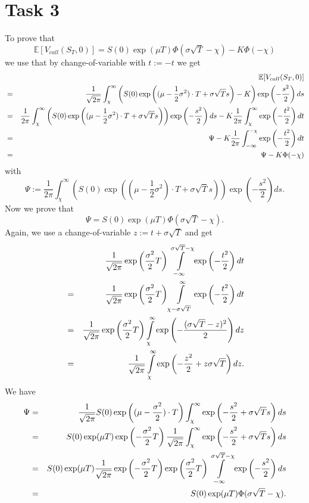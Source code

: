 \documentclass[10pt,a4paper]{article}
\begin{document}
\section*{Task 3}
To prove that
\[
\mathbb{E}[V_{call}(S_T,0)]=S(0)\exp(\mu T)\Phi(\sigma\sqrt{T}-\chi)-K\Phi(-\chi)
\]
we use that by change-of-variable with $t:=-t$ we get
\begin{eqnarray}
&&\mathbb{E}[V_{call}(S_T,0)] \notag\\
&=&\frac{1}{\sqrt{2\pi}}\int_{\chi}^{\infty}\left(S(0)\exp\left((\mu-\frac{1}{2}\sigma^2)\cdot T+\sigma\sqrt{T}s\right)-K\right)\exp\left(-\frac{s^2}{2}\right)ds \notag\\
&=&\frac{1}{2\pi}\int_{\chi}^{\infty}\left(S(0)\exp\left((\mu-\frac{1}{2}\sigma^2)\cdot T+\sigma\sqrt{T}s\right)\right)\exp\left(-\frac{s^2}{2}\right)ds-K\frac{1}{2\pi}\int_{\chi}^{\infty}\exp\left(-\frac{t^2}{2}\right)dt \notag\\
&=&\Psi-K\frac{1}{2\pi}\int_{-\infty}^{-\chi}\exp\left(-\frac{t^2}{2}\right)dt \notag\\
&=&\Psi-K\Phi(-\chi) \notag
\end{eqnarray}
with
\[
\Psi:=\frac{1}{2\pi}\int_{\chi}^{\infty}\left(S(0)\exp\left((\mu-\frac{1}{2}\sigma^2)\cdot T+\sigma\sqrt{T}s\right)\right)\exp\left(-\frac{s^2}{2}\right)ds.
\]
Now we prove that
\[
\Psi=S(0)\exp(\mu T)\Phi(\sigma\sqrt{T}-\chi).
\]
Again, we use a change-of-variable $z:=t+\sigma\sqrt{T}$ and get
\begin{eqnarray}
&&\frac{1}{\sqrt{2\pi}}\exp\left(\frac{\sigma^2}{2}T\right)\int\limits_{-\infty}^{\sigma\sqrt{T}-\chi}\exp\left(-\frac{t^2}{2}\right)dt \notag\\
&=&\frac{1}{\sqrt{2\pi}}\exp\left(\frac{\sigma^2}{2}T\right)\int\limits_{\chi-\sigma\sqrt{T}}^{\infty}\exp\left(-\frac{t^2}{2}\right)dt \notag\\
&=&\frac{1}{\sqrt{2\pi}}\exp\left(\frac{\sigma^2}{2}T\right)\int\limits_{\chi}^{\infty}\exp\left(-\frac{(\sigma\sqrt{T}-z)^2}{2}\right)dz \notag\\
&=&\frac{1}{\sqrt{2\pi}}\int\limits_{\chi}^{\infty}\exp\left(-\frac{z^2}{2}+z\sigma\sqrt{T}\right)dz. \notag
\end{eqnarray}
We have
\begin{eqnarray}
\Psi&=&\frac{1}{\sqrt{2\pi}}S(0)\exp\left((\mu-\frac{\sigma^2}{2})\cdot T\right)\int_{\chi}^{\infty}\exp\left(-\frac{s^2}{2}+\sigma\sqrt{T}s\right)ds \notag\\
&=&S(0)\exp(\mu T)\exp\left(-\frac{\sigma^2}{2}T\right)\frac{1}{\sqrt{2\pi}}\int_{\chi}^{\infty}\exp\left(-\frac{s^2}{2}+\sigma\sqrt{T}s\right)ds \notag\\
&=&S(0)\exp(\mu T)\frac{1}{\sqrt{2\pi}}\exp\left(-\frac{\sigma^2}{2}T\right)\exp\left(\frac{\sigma^2}{2}T\right)\int\limits_{-\infty}^{\sigma\sqrt{T}-\chi}\exp\left(-\frac{s^2}{2}\right)ds \notag\\
&=&S(0)\exp(\mu T)\Phi(\sigma\sqrt{T}-\chi). \notag
\end{eqnarray}
\end{document}
